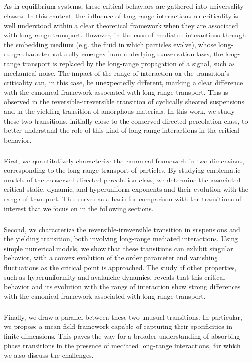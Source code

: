\subparagraph{}As in equilibrium systems, these critical behaviors are gathered into universality classes. In this context, the influence of long-range interactions on criticality is well understood within a clear theoretical framework when they are associated with long-range transport. However, in the case of mediated interactions through the embedding medium (e.g. the fluid in which particles evolve), whose long-range character naturally emerges from underlying conservation laws, the long-range transport is replaced by the long-range propagation of a signal, such as mechanical noise. The impact of the range of interaction on the transition's criticality can, in this case, be unexpectedly different, marking a clear difference with the canonical framework associated with long-range transport. This is observed in the reversible-irreversible transition of cyclically sheared suspensions and in the yielding transition of amorphous materials. In this work, we study these two transitions, initially close to the conserved directed percolation class, to better understand the role of this kind of long-range interactions in the critical behavior.

\subparagraph{}First, we quantitatively characterize the canonical framework in two dimensions, corresponding to the long-range transport of particles. By studying emblematic models of the conserved directed percolation class, we determine the associated critical static, dynamic, and hyperuniform exponents and their evolution with the range of transport. This serves as a basis for comparison with the transitions of interest that we focus on in the following sections.

\subparagraph{}Second, we characterize the reversible-irreversible transition in suspensions and the yielding transition, both involving long-range mediated interactions. Using simple numerical models, we show that these transitions can exhibit singular behavior, with a convex evolution of the order parameter and vanishing fluctuations as the critical point is approached. The study of other properties, such as hyperuniformity and avalanche dynamics, reveals that this critical behavior and its evolution with the range of interaction show strong differences with the canonical framework associated with long-range transport.

\subparagraph{}Finally, we draw a parallel between these two unusual transitions. In particular, we propose a mean-field framework capable of capturing their specificities in finite dimensions. This paves the way for a broader understanding of absorbing phase transitions in the presence of mediated long-range interactions, for which we also discuss the challenges.

\thispagestyle{empty}